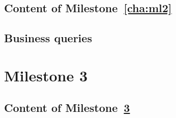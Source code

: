     \section{Content of Milestone~\ref{cha:ml2}} 
        \label{sec:ml2_content}
    

    \section{Business queries} \label{sec:Business queries}
    


\chapter{Milestone 3} \label{cha:ml3}
    \section{Content of Milestone~\ref{cha:ml3}} 
        \label{sec:ml3_content}
    




